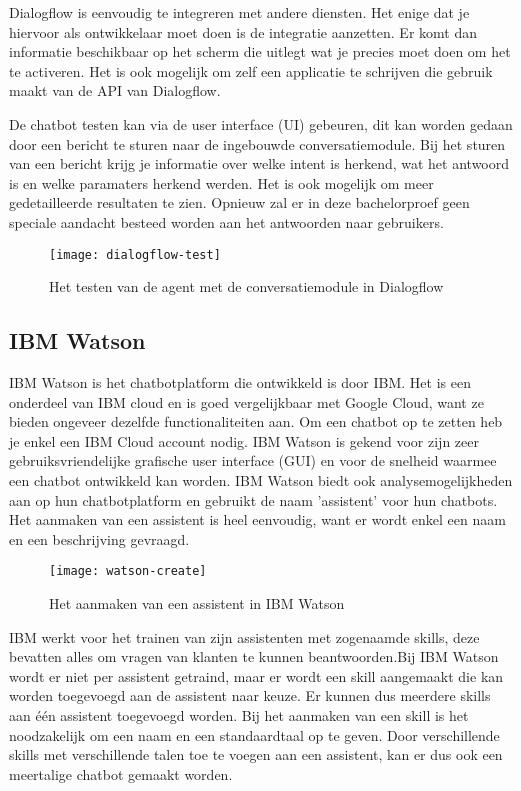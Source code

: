 Dialogflow is eenvoudig te integreren met andere diensten. Het enige dat je hiervoor als ontwikkelaar moet doen is de integratie aanzetten. Er komt dan informatie beschikbaar op het scherm die uitlegt wat je precies moet doen om het te activeren. Het is ook mogelijk om zelf een applicatie te schrijven die gebruik maakt van de API van Dialogflow.

De chatbot testen kan via de user interface (UI) gebeuren, dit kan worden gedaan door een bericht te sturen naar de ingebouwde conversatiemodule. Bij het sturen van een bericht krijg je informatie over welke intent is herkend, wat het antwoord is en welke paramaters herkend werden. Het is ook mogelijk om meer gedetailleerde resultaten te zien. Opnieuw zal er in deze bachelorproef geen speciale aandacht besteed worden aan het antwoorden naar gebruikers.

\begin{figure}[H]
    \label{fig:dialogflow-test}
    \centering
    \texttt{[image: dialogflow-test]}
    \caption{Het testen van de agent met de conversatiemodule in Dialogflow}
\end{figure}

\subsection{IBM Watson}
\label{subsec:werking-platformen-ibm-watson}

IBM Watson is het chatbotplatform die ontwikkeld is door IBM. Het is een onderdeel van IBM cloud en is goed vergelijkbaar met Google Cloud, want ze bieden ongeveer dezelfde functionaliteiten aan. Om een chatbot op te zetten heb je enkel een IBM Cloud account nodig. IBM Watson is gekend voor zijn zeer gebruiksvriendelijke grafische user interface (GUI) en voor de snelheid waarmee een chatbot ontwikkeld kan worden. IBM Watson biedt ook analysemogelijkheden aan op hun chatbotplatform en gebruikt de naam 'assistent' voor hun chatbots. Het aanmaken van een assistent is heel eenvoudig, want er wordt enkel een naam en een beschrijving gevraagd.

\begin{figure}[H]
    \label{fig:watson-create}
    \centering
    \texttt{[image: watson-create]}
    \caption{Het aanmaken van een assistent in IBM Watson}
\end{figure}

IBM werkt voor het trainen van zijn assistenten met zogenaamde skills, deze bevatten alles om vragen van klanten te kunnen beantwoorden.Bij IBM Watson wordt er niet per assistent getraind, maar er wordt een skill aangemaakt die kan worden toegevoegd aan de assistent naar keuze. Er kunnen dus meerdere skills aan één assistent toegevoegd worden. Bij het aanmaken van een skill is het noodzakelijk om een naam en een standaardtaal op te geven. Door verschillende skills met verschillende talen toe te voegen aan een assistent, kan er dus ook een meertalige chatbot gemaakt worden.

